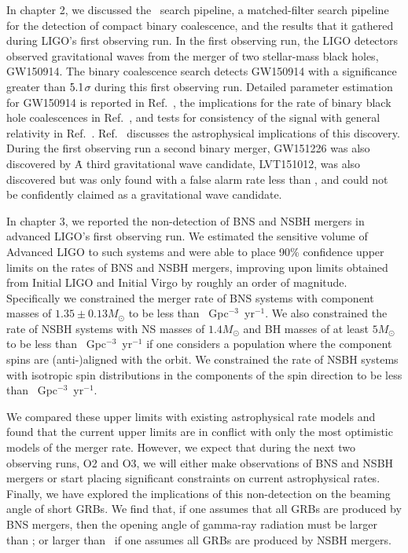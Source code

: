 
In chapter 2, we discussed the \pycbc{}\ search pipeline, a matched-filter
search pipeline for the detection of compact binary coalescence, and the results
that it gathered during LIGO's first observing run. In the first observing run, the LIGO detectors observed
gravitational waves from the merger of two
stellar-mass black holes, GW150914. The binary coalescence search detects GW150914 with
a significance greater than $5.1$$\sigma$ during this first observing
run. Detailed parameter estimation for
GW150914 is reported in Ref.~\cite{GW150914-PARAMESTIM}, the implications for
the rate of binary black hole coalescences in Ref.~\cite{GW150914-RATES}, and
tests for consistency of the signal with general relativity in
Ref.~\cite{GW150914-TESTOFGR}.  Ref.~\cite{GW150914-ASTRO} discusses the
astrophysical implications of this discovery. During the first observing run
a second binary merger, GW151226 was also discovered by \pycbc{}\. A third
gravitational wave candidate, LVT151012, was also discovered but was only found
with a false alarm rate less than \CBCSECONDEVENTFAR, and could not be
confidently claimed as a gravitational wave candidate.

In chapter 3, we reported the non-detection of \ac{BNS} and \ac{NSBH} mergers in advanced \ac{LIGO}'s first observing run.
We estimated the sensitive volume of Advanced \ac{LIGO} to such systems and were able to place 90\%
confidence upper limits on the rates of \ac{BNS} and \ac{NSBH} mergers, improving upon limits
obtained from Initial \ac{LIGO} and Initial Virgo by roughly an order of magnitude.
Specifically we constrained the merger rate of \ac{BNS} systems with component masses of $1.35\pm0.13M_{\odot}$
to be less than \MainBNSULPyCBCHighSpin~Gpc$^{-3}$~yr$^{-1}$. We also constrained
the rate of \ac{NSBH} systems with NS masses of $1.4 M_\odot$ and BH masses of at least $5 M_{\odot}$ to be less than \MainNSBHULPyCBCFiveAligned~Gpc$^{-3}$~yr$^{-1}$ if one considers a population where the component spins are (anti-)aligned with
the orbit. We constrained the rate of \ac{NSBH} systems with isotropic spin distributions in the
components of the spin direction to be less than \MainNSBHULPyCBCFiveIso~Gpc$^{-3}$~yr$^{-1}$.

We compared these upper limits with existing astrophysical rate models and found that the
current upper limits are in conflict with only the most optimistic models of the merger
rate. However, we expect that during the next two observing runs, O2 and O3, we will
either make observations of \ac{BNS} and \ac{NSBH} mergers or start placing significant constraints
on current astrophysical rates. Finally, we have explored the implications of this non-detection on
the beaming angle of short \acp{GRB}. We find that, if one assumes that all \acp{GRB}
are produced by \ac{BNS} mergers, then the opening angle of gamma-ray radiation must be larger
than \GRBBNSBeamingAngleConstraint; or larger than \GRBNSBHFiveBeamingAngleConstraint\ if
one assumes all \acp{GRB} are produced by \ac{NSBH} mergers.

